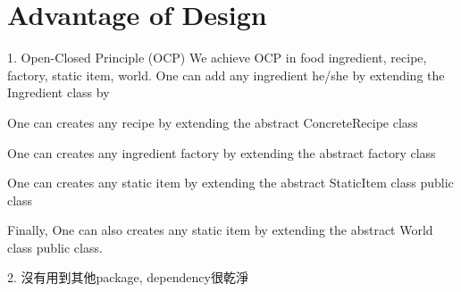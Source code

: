 \section{Advantage of Design}

1.	Open-Closed Principle (OCP)
    We achieve OCP in food ingredient, recipe, factory, static item, world.
    One can add any ingredient he/she by extending the Ingredient class by 


One can creates any recipe by extending the abstract ConcreteRecipe class


One can creates any ingredient factory by extending the abstract factory class


One can creates any static item by extending the abstract StaticItem class public class


Finally, One can also creates any static item by extending the abstract World class public class.

2. 沒有用到其他package, dependency很乾淨

